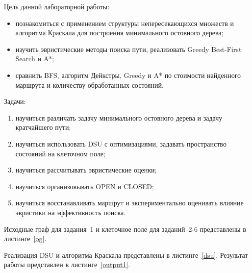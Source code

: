 
Цель данной лабораторной работы:
\begin{itemize}
	\item познакомиться с применением структуры непересекающихся множеств и алгоритма Краскала для построения минимального остовного дерева;
	\item изучить эвристические методы поиска пути, реализовать Greedy Best-First Search и A*;
	\item сравнить BFS, алгоритм Дейкстры, Greedy и A* по стоимости найденного маршрута и количеству обработанных состояний.
\end{itemize}

Задачи:
\begin{enumerate}
	\item научиться различать задачу минимального остовного дерева и задачу кратчайшего пути;
	\item научиться использовать DSU с оптимизациями, задавать пространство состояний на клеточном поле;
	\item научиться рассчитывать эвристические оценки;
	\item научиться организовывать OPEN и CLOSED;
	\item научиться восстанавливать маршрут и экспериментально оценивать влияние эвристики на эффективность поиска.
\end{enumerate}



Исходные граф для задания~1 и клеточное поле для заданий~2-6 представлены в листинге~\ref{og}.




Реализация DSU и алгоритма Краскала представлены в листинге~\ref{dsu}.
Результат работы представлен в листинге~\ref{output1}.





